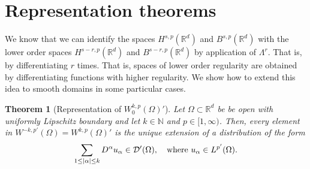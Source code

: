 \documentclass[
    a4paper,
    DIV=14,
    abstract=true,
    numbers=noenddot
]
{scrartcl}
\newtheorem{theorem}{Theorem}[section]
\theoremstyle{definition}
\newcommand{\N}{\mathbb{N}}
\newcommand{\R}{\mathbb{R}}
\newcommand{\Dd}{\mathcal{D}}
\begin{document}
\section{Representation theorems}
We know that we can identify the spaces $H^{s,p}(\R^d )$ and $B^{s,p}(\R^d )$ with the lower order spaces $H^{s-r,p}(\R^d )$ and $B^{s-r,p}(\R^d )$ by application of $\Lambda ^r$. That is, by differentiating $r$ times. That is, spaces of lower order regularity are obtained by differentiating functions with higher regularity. We show how to extend this idea to smooth domains in some particular cases.

\begin{theorem}[Representation of $W_0^{k,p}(\Omega )'$]\label{riesz representation}
  Let $\Omega \subset \R^d$ be be open with uniformly Lipschitz boundary and let  $k \in \N$ and $p \in [1,\infty)$. Then, every element in $W^{-k,p'}(\Omega )=W^{k,p}(\Omega )'$ is the unique extension of a distribution  of the form
  \begin{align*}
    \sum_{1\leq\abs{\alpha}\leq k} D^\alpha u_\alpha\in \Dd'(\Omega ),\quad \text{where }    u_\alpha \in L^{p'}(\Omega ).
  \end{align*}

\end{theorem}
\end{document}
